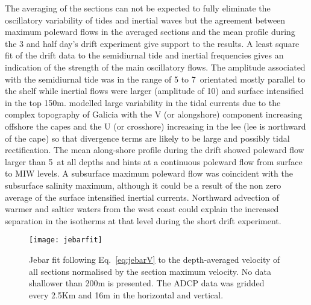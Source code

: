 The averaging of the sections can not be expected to fully
eliminate the oscillatory variability of tides and inertial waves
but the agreement between maximum poleward flows in the averaged
sections and the mean profile during the 3 and half day's drift
experiment give support to the results. A least square fit of the
drift data to the semidiurnal tide and inertial frequencies gives
an indication of the strength of the main oscillatory flows. The
amplitude associated with the semidiurnal tide was in the range of
5 to 7\velc\, orientated mostly parallel to the shelf while
inertial flows were larger (amplitude of 10\velc) and surface
intensified in the top 150m. \citet{Fanjul97} modelled large
variability in the tidal currents due to the complex topography of
Galicia with the V (or alongshore) component increasing offshore
the capes and the U (or crosshore) increasing in the lee (lee is
northward of the cape) so that divergence terms are likely to be
large and possibly tidal rectification. The mean along-shore
profile during the drift showed poleward flow larger than 5\velc\,
at all depths and hints at a continuous poleward flow from surface
to MIW levels. A subsurface maximum poleward flow was coincident
with the subsurface salinity maximum, although it could be a
result of the non zero average of the surface intensified inertial
currents. Northward advection of warmer and saltier waters from
the west coast could explain the increased separation in the
isotherms at that level during the short drift experiment.
\begin{figure}[t]
\centering %
\texttt{[image: jebarfit]}
\caption{Jebar fit following Eq.~\ref{eq:jebarV} to the
depth-averaged velocity of all sections normalised by the section
maximum velocity. No data shallower than 200m is presented. The
ADCP data was gridded every 2.5Km and 16m in the horizontal and
vertical.} \label{fig:thal_jebar}
\end{figure}


